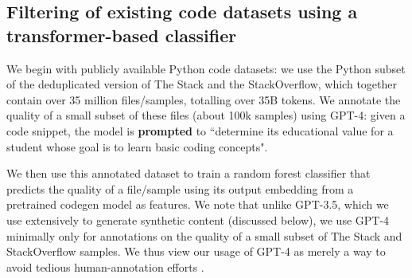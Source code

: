 \subsection{Filtering of existing code datasets using a transformer-based classifier}
We begin with publicly available Python code datasets: we use the Python subset of the deduplicated version of The Stack and the StackOverflow, which together contain over 35 million files/samples, totalling over 35B tokens. We annotate the quality of a small subset of these files (about 100k samples) using GPT-4: given a code snippet, the model is \textbf{prompted} to ``determine its educational value for a student whose goal is to learn basic coding concepts".

We then use this annotated dataset to train a  random forest classifier that predicts the quality of a file/sample using its output embedding from a pretrained codegen model as features. We note that unlike GPT-3.5, which we use extensively to generate synthetic content (discussed below), we use GPT-4 minimally only for annotations on the quality of a small subset of The Stack and StackOverflow samples. We thus view our usage of GPT-4 as merely a way to avoid tedious human-annotation efforts 
\cite{dubois2023alpacafarm}. 

